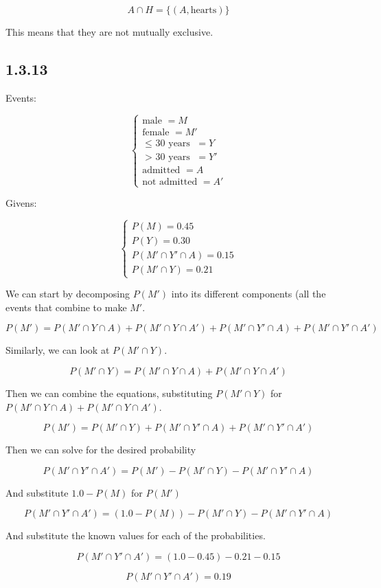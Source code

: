 \documentclass{article}
\begin{document}
\[
A\cap H = \{\left(A, \text{hearts}\right)\}
\]

This means that they are not mutually exclusive.

\subsection*{1.3.13}

Events:

\[
\begin{cases}
\text{male } = M \\
\text{female } = M' \\
\text{$\le$ 30 years } = Y \\
\text{$>$ 30 years } = Y' \\
\text{admitted } = A \\
\text{not admitted } = A'
\end{cases}
\]

Givens:

\[
\begin{cases}
P(M) = 0.45 \\
P(Y) = 0.30 \\
P(M'\cap Y'\cap A) = 0.15 \\
P(M'\cap Y) = 0.21
\end{cases}
\]

We can start by decomposing $P(M')$ into its different components (all
the events that combine to make $M'$.

\[
P(M') = P(M'\cap Y\cap A) + P(M'\cap Y\cap A') + P(M'\cap Y'\cap A) + P(M'\cap Y'\cap A')
\]

Similarly, we can look at $P(M'\cap Y)$.

\[
P(M'\cap Y) = P(M'\cap Y\cap A) + P(M'\cap Y\cap A')
\]

Then we can combine the equations, substituting $P(M'\cap Y)$ for
$P(M'\cap Y\cap A) + P(M'\cap Y\cap A')$.

\[
P(M') = P(M'\cap Y) + P(M'\cap Y'\cap A) + P(M'\cap Y'\cap A')
\]

Then we can solve for the desired probability

\[
P(M'\cap Y'\cap A') = P(M') - P(M'\cap Y) - P(M'\cap Y'\cap A)
\]

And substitute $1.0 - P(M)$ for $P(M')$

\[
P(M'\cap Y'\cap A') = (1.0 - P(M)) - P(M'\cap Y) - P(M'\cap Y'\cap A)
\]

And substitute the known values for each of the probabilities.

\[
P(M'\cap Y'\cap A') = (1.0 - 0.45) - 0.21 - 0.15
\]

\[
\boxed{P(M'\cap Y'\cap A') = 0.19}
\]
\end{document}

